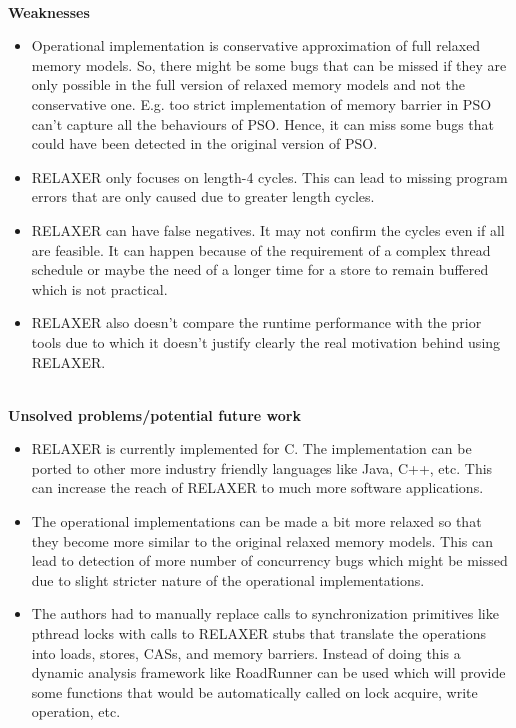 \documentclass[20pt]{letter}
\begin{document}
\begin{enumerate}
{\textbf{\\Weaknesses}\\
\begin{itemize}
    \item Operational implementation is conservative approximation of full relaxed memory models. So, there might be some bugs that can be missed if they are only possible in the full version of relaxed memory models and not the conservative one. E.g. too strict implementation of memory barrier in PSO can't capture all the behaviours of PSO. Hence, it can miss some bugs that could have been detected in the original version of PSO.
    \item RELAXER only focuses on length-4 cycles. This can lead to missing program errors that are only caused due to greater length cycles.
    \item RELAXER can have false negatives. It may not confirm the cycles even if all are feasible. It can happen because of the requirement of a complex thread schedule or maybe the need of a longer time for a store to remain buffered which is not practical.
    \item RELAXER also doesn't compare the runtime performance with the prior tools due to which it doesn't justify clearly the real motivation behind using RELAXER.
\end{itemize}

\textbf{\\Unsolved problems/potential future work}\\
\begin{itemize}
    \item RELAXER is currently implemented for C. The implementation can be ported to other more industry friendly languages like Java, C++, etc. This can increase the reach of RELAXER to much more software applications.
    \item The operational implementations can be made a bit more relaxed so that they become more similar to the original relaxed memory models. This can lead to detection of more number of concurrency bugs which might be missed due to slight stricter nature of the operational implementations.
    \item The authors had to manually replace calls to synchronization primitives like pthread locks with calls to RELAXER stubs that translate the operations into loads, stores, CASs, and memory barriers. Instead of doing this a dynamic analysis framework like RoadRunner can be used which will provide some functions that would be automatically called on lock acquire, write operation, etc.
\end{itemize}
}
\end{enumerate}
\end{document}
